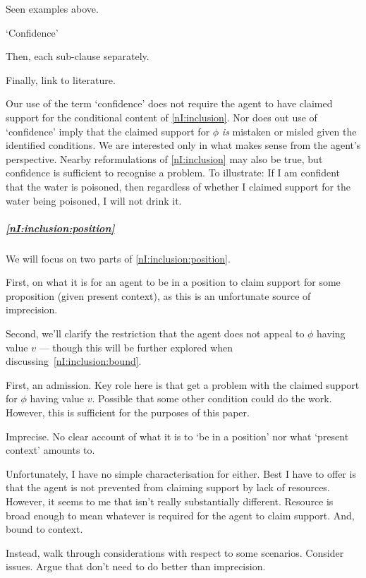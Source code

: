 {
  \color{red}
  Seen examples above.
}

\begin{note}
  `Confidence'

  Then, each sub-clause separately.

  Finally, link to literature.
\end{note}

\begin{note}[`Confidence']
  Our use of the term `confidence' does not require the agent to have claimed support for the conditional content of \ref{nI:inclusion}.
  Nor does out use of `confidence' imply that the claimed support for \(\phi\) \emph{is} mistaken or misled given the identified conditions.
  We are interested only in what makes sense from the agent's perspective.
  Nearby reformulations of \ref{nI:inclusion} may also be true, but confidence is sufficient to recognise a problem.
  To illustrate: If I am confident that the water is poisoned, then regardless of whether I claimed support for the water being poisoned, I will not drink it.
\end{note}

\subparagraph{\ref{nI:inclusion:position}}

\begin{note}
  We will focus on two parts of \ref{nI:inclusion:position}.

  First, on what it is for an agent to be in a position to claim support for some proposition (given present context), as this is an unfortunate source of imprecision.

  Second, we'll clarify the restriction that the agent does not appeal to \(\phi\) having value \(v\) --- though this will be further explored when discussing~\ref{nI:inclusion:bound}.
\end{note}

\begin{note}
  First, an admission.
  Key role here is that get a problem with the claimed support for \(\phi\) having value \(v\).
  Possible that some other condition could do the work.
  However, this is sufficient for the purposes of this paper.
\end{note}

\begin{note}
  Imprecise.
  No clear account of what it is to `be in a position' nor what `present context' amounts to.

  Unfortunately, I have no simple characterisation for either.
  Best I have to offer is that the agent is not prevented from claiming support by lack of resources.
  However, it seems to me that isn't really substantially different.
  Resource is broad enough to mean whatever is required for the agent to claim support.
  And, bound to context.

  Instead, walk through considerations with respect to some scenarios.
  Consider issues.
  Argue that don't need to do better than imprecision.
\end{note}

